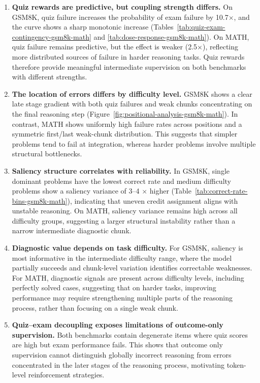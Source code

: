 \documentclass[12pt]{report}
\begin{document}
\begin{enumerate}

\item \textbf{Quiz rewards are predictive, but coupling strength differs.}
On GSM8K, quiz failure increases the probability of exam failure by
10.7$\times$, and the curve shows a sharp monotonic
increase (Tables~\ref{tab:quiz-exam-contingency-gsm8k-math} and
\ref{tab:dose-response-gsm8k-math}). On MATH, quiz failure remains
predictive, but the effect is weaker (2.5$\times$), reflecting more
distributed sources of failure in harder reasoning tasks. Quiz rewards
therefore provide meaningful intermediate supervision on both
benchmarks with different strengths.

\item \textbf{The location of errors differs by difficulty level.}
GSM8K shows a clear late stage gradient with both quiz failures and weak
chunks concentrating on the final reasoning step
(Figure~\ref{fig:positional-analysis-gsm8k-math}). In contrast, MATH
shows uniformly high failure rates across positions and a symmetric
first/last weak-chunk distribution. This suggests that simpler problems
tend to fail at integration, whereas harder problems involve multiple
structural bottlenecks.

\item \textbf{Saliency structure correlates with reliability.}
In GSM8K, single dominant problems have the lowest correct rate and
medium difficulty problems show a saliency variance of 3--4 $\times$ higher  
(Table~\ref{tab:correct-rate-bins-gsm8k-math}), indicating that uneven
credit assignment aligns with unstable reasoning. On MATH, saliency
variance remains high across all difficulty groups, suggesting a larger
structural instability rather than a narrow intermediate diagnostic
chunk.

\item \textbf{Diagnostic value depends on task difficulty.}
For GSM8K, saliency is most informative in the intermediate
difficulty range, where the model partially succeeds and chunk-level
variation identifies correctable weaknesses. For MATH, diagnostic
signals are present across difficulty levels, including perfectly
solved cases, suggesting that on harder tasks, improving performance may require
strengthening multiple parts of the reasoning process, rather than
focusing on a single weak chunk.

\item \textbf{Quiz--exam decoupling exposes limitations of outcome-only supervision.}
Both benchmarks contain degenerate items where quiz scores are high
but exam performance fails. This shows that outcome only supervision cannot
distinguish globally incorrect reasoning from errors concentrated
in the later stages of the reasoning process, motivating token-level reinforcement strategies.
\end{enumerate}
\end{document}
